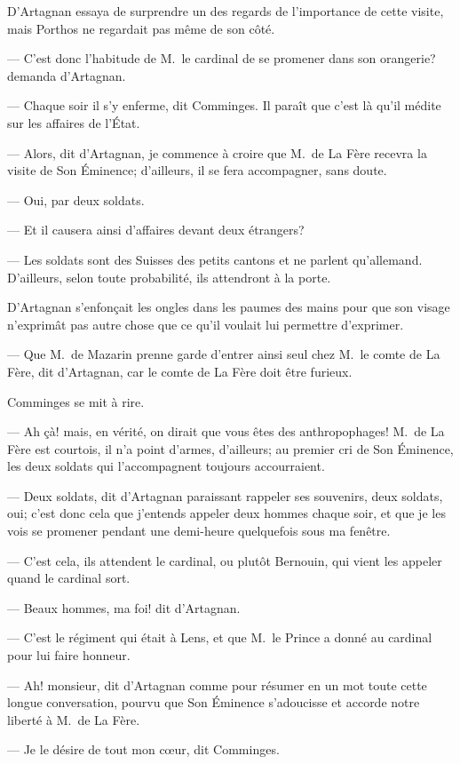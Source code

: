 D'Artagnan essaya de surprendre un des regards de l'importance de cette visite, mais Porthos ne regardait pas même de son côté.

— C'est donc l'habitude de M.~le cardinal de se promener dans son orangerie? demanda d'Artagnan.

— Chaque soir il s'y enferme, dit Comminges. Il paraît que c'est là qu'il médite sur les affaires de l'État.

— Alors, dit d'Artagnan, je commence à croire que M.~de La Fère recevra la visite de Son Éminence; d'ailleurs, il se fera accompagner, sans doute.

— Oui, par deux soldats.

— Et il causera ainsi d'affaires devant deux étrangers?

— Les soldats sont des Suisses des petits cantons et ne parlent qu'allemand. D'ailleurs, selon toute probabilité, ils attendront à la porte.

D'Artagnan s'enfonçait les ongles dans les paumes des mains pour que son visage n'exprimât pas autre chose que ce qu'il voulait lui permettre d'exprimer.

— Que M.~de Mazarin prenne garde d'entrer ainsi seul chez M.~le comte de La Fère, dit d'Artagnan, car le comte de La Fère doit être furieux.

Comminges se mit à rire.

— Ah çà! mais, en vérité, on dirait que vous êtes des anthropophages! M.~de La Fère est courtois, il n'a point d'armes, d'ailleurs; au premier cri de Son Éminence, les deux soldats qui l'accompagnent toujours accourraient.

— Deux soldats, dit d'Artagnan paraissant rappeler ses souvenirs, deux soldats, oui; c'est donc cela que j'entends appeler deux hommes chaque soir, et que je les vois se promener pendant une demi-heure quelquefois sous ma fenêtre.

— C'est cela, ils attendent le cardinal, ou plutôt Bernouin, qui vient les appeler quand le cardinal sort.

— Beaux hommes, ma foi! dit d'Artagnan.

— C'est le régiment qui était à Lens, et que M.~le Prince a donné au cardinal pour lui faire honneur.

— Ah! monsieur, dit d'Artagnan comme pour résumer en un mot toute cette longue conversation, pourvu que Son Éminence s'adoucisse et accorde notre liberté à M.~de La Fère.

— Je le désire de tout mon cœur, dit Comminges.

